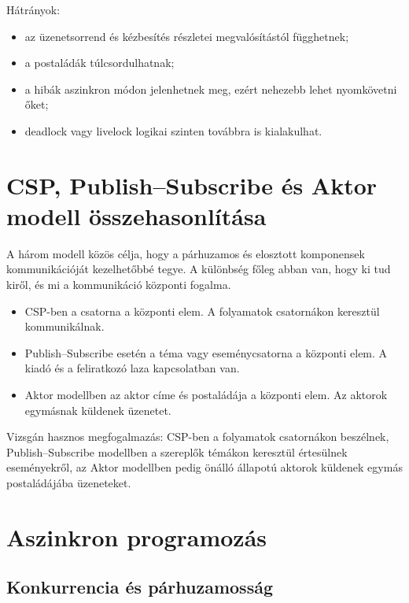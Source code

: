 Hátrányok:

\begin{itemize}
  \item az üzenetsorrend és kézbesítés részletei megvalósítástól függhetnek;
  \item a postaládák túlcsordulhatnak;
  \item a hibák aszinkron módon jelenhetnek meg, ezért nehezebb lehet nyomkövetni őket;
  \item deadlock vagy livelock logikai szinten továbbra is kialakulhat.
\end{itemize}

\section{CSP, Publish--Subscribe és Aktor modell összehasonlítása}

\begin{center}

\end{center}

A három modell közös célja, hogy a párhuzamos és elosztott komponensek kommunikációját kezelhetőbbé tegye. A különbség főleg abban van, hogy ki tud kiről, és mi a kommunikáció központi fogalma.

\begin{itemize}
  \item CSP-ben a csatorna a központi elem. A folyamatok csatornákon keresztül kommunikálnak.
  \item Publish--Subscribe esetén a téma vagy eseménycsatorna a központi elem. A kiadó és a feliratkozó laza kapcsolatban van.
  \item Aktor modellben az aktor címe és postaládája a központi elem. Az aktorok egymásnak küldenek üzenetet.
\end{itemize}

Vizsgán hasznos megfogalmazás: CSP-ben a folyamatok csatornákon beszélnek, Publish--Subscribe modellben a szereplők témákon keresztül értesülnek eseményekről, az Aktor modellben pedig önálló állapotú aktorok küldenek egymás postaládájába üzeneteket.

\section{Aszinkron programozás}

\subsection{Konkurrencia és párhuzamosság}

